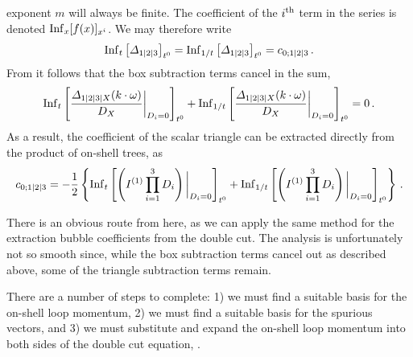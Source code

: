 exponent $m$ will always be finite. The coefficient of the $i^{\rm th}$ term in
the series is denoted ${\rm Inf}_x[f(x)]_{x^i}$. We may therefore write
\begin{equation}
  {\rm Inf}_t \left[\Delta_{1|2|3}\right]_{t^0} = {\rm Inf}_{1/t} \left[\Delta_{1|2|3}\right]_{t^0} = c_{0;1|2|3} \,.
\end{equation}
From  it follows that the box subtraction terms cancel in the sum,
\begin{align}
{\rm Inf}_t \left[ \frac{\Delta_{1|2|3|X}(k\cdot\omega)}{D_X} \bigg|_{D_i=0} \right]_{t^0} + {\rm Inf}_{1/t} \left[ \frac{\Delta_{1|2|3|X}(k\cdot\omega)}{D_X} \bigg|_{D_i=0} \right]_{t^0} = 0 \,.
\end{align}
As a result, the coefficient of the scalar triangle can be extracted directly from the product of on-shell trees, as
\begin{equation} \label{eq:direct_extraction_triangle}
  c_{0;1|2|3} = -\frac{1}{2} \left\{
        {\rm Inf}_t \left[\left( I^{(1)} \prod_{i=1}^3 D_i \right) \bigg|_{D_i = 0} \right]_{t^0}
  + {\rm Inf}_{1/t} \left[\left( I^{(1)} \prod_{i=1}^3 D_i \right) \bigg|_{D_i = 0} \right]_{t^0}\right\} \,.
\end{equation}

There is an obvious route from here, as we can apply the same method for the extraction bubble
coefficients from the double cut. The analysis is unfortunately not so smooth
since, while the box subtraction terms cancel out as described above, some of the
triangle subtraction terms remain.

There are a number of steps to complete: 1) we must find a suitable basis for
the on-shell loop momentum, 2) we must find a suitable basis for the spurious
vectors, and 3) we must substitute and expand the on-shell loop momentum into both sides of
the double cut equation, .

